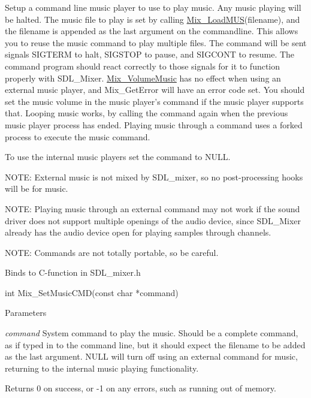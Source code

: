 Setup a command line music player to use to play music. Any music playing will be halted. The music file to play is set by calling \hyperlink{namespace_tao_1_1_sdl_ad6c75b94200b928986e8761beab8d85d}{Mix\_\-LoadMUS}(filename), and the filename is appended as the last argument on the commandline. This allows you to reuse the music command to play multiple files. The command will be sent signals SIGTERM to halt, SIGSTOP to pause, and SIGCONT to resume. The command program should react correctly to those signals for it to function properly with SDL\_\-Mixer. \hyperlink{namespace_tao_1_1_sdl_a0f37be729516417cc01f98fb63f0b426}{Mix\_\-VolumeMusic} has no effect when using an external music player, and Mix\_\-GetError will have an error code set. You should set the music volume in the music player's command if the music player supports that. Looping music works, by calling the command again when the previous music player process has ended. Playing music through a command uses a forked process to execute the music command. 

To use the internal music players set the command to NULL. 

NOTE: External music is not mixed by SDL\_\-mixer, so no post-\/processing hooks will be for music. 

NOTE: Playing music through an external command may not work if the sound driver does not support multiple openings of the audio device, since SDL\_\-Mixer already has the audio device open for playing samples through channels. 

NOTE: Commands are not totally portable, so be careful. 

Binds to C-\/function in SDL\_\-mixer.h 
\begin{DoxyCode}
int Mix_SetMusicCMD(const char *command)
\end{DoxyCode}
 


\begin{DoxyParams}{Parameters}
\item[{\em command}]System command to play the music. Should be a complete command, as if typed in to the command line, but it should expect the filename to be added as the last argument. NULL will turn off using an external command for music, returning to the internal music playing functionality. \end{DoxyParams}
\begin{DoxyReturn}{Returns}
0 on success, or -\/1 on any errors, such as running out of memory. 
\end{DoxyReturn}

